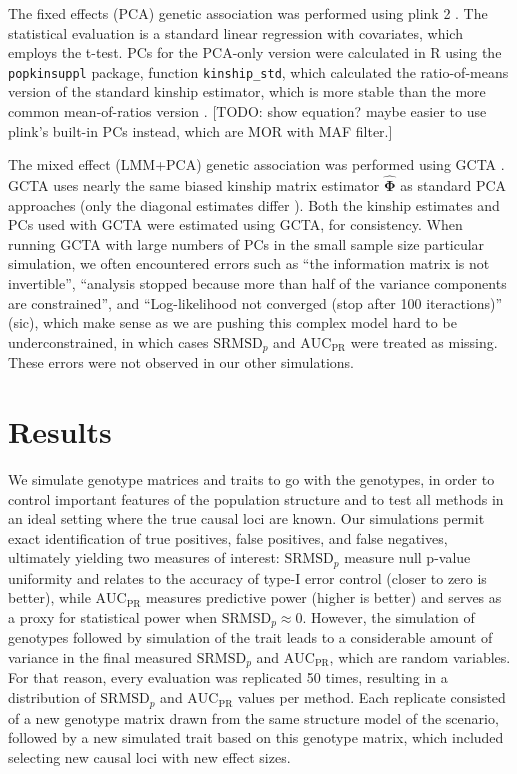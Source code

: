 \documentclass[11pt]{article}
\newcommand{\rmsd}{\text{SRMSD}_p}
\newcommand{\auc}{\text{AUC}_\text{PR}}
\begin{document}
The fixed effects (PCA) genetic association was performed using plink 2 \citep{chang_second-generation_2015}.
The statistical evaluation is a standard linear regression with covariates, which employs the t-test.
PCs for the PCA-only version were calculated in R using the \texttt{popkinsuppl} package, function \texttt{kinship\_std}, which calculated the ratio-of-means version of the standard kinship estimator, which is more stable than the more common mean-of-ratios version \citep{ochoa_fst2}.
[TODO: show equation? maybe easier to use plink's built-in PCs instead, which are MOR with MAF filter.]

The mixed effect (LMM+PCA) genetic association was performed using GCTA \citep{yang_gcta:_2011}.
GCTA uses nearly the same biased kinship matrix estimator $\mathbf{\hat{\Phi}}$ as standard PCA approaches (only the diagonal estimates differ \citep{yang_gcta:_2011}).
Both the kinship estimates and PCs used with GCTA were estimated using GCTA, for consistency.
When running GCTA with large numbers of PCs in the small sample size particular simulation, we often encountered errors such as ``the information matrix is not invertible'', ``analysis stopped because more than half of the variance components are constrained'', and ``Log-likelihood not converged (stop after 100 iteractions)'' (sic), which make sense as we are pushing this complex model hard to be underconstrained, in which cases $\rmsd$ and $\auc$ were treated as missing.
These errors were not observed in our other simulations.



\section{Results}

We simulate genotype matrices and traits to go with the genotypes, in order to control important features of the population structure and to test all methods in an ideal setting where the true causal loci are known.
Our simulations permit exact identification of true positives, false positives, and false negatives, ultimately yielding two measures of interest: $\rmsd$ measure null p-value uniformity and relates to the accuracy of type-I error control (closer to zero is better), while $\auc$ measures predictive power (higher is better) and serves as a proxy for statistical power when $\rmsd \approx 0$.
However, the simulation of genotypes followed by simulation of the trait leads to a considerable amount of variance in the final measured $\rmsd$ and $\auc$, which are random variables.
For that reason, every evaluation was replicated 50 times, resulting in a distribution of $\rmsd$ and $\auc$ values per method.
Each replicate consisted of a new genotype matrix drawn from the same structure model of the scenario, followed by a new simulated trait based on this genotype matrix, which included selecting new causal loci with new effect sizes.
\end{document}
